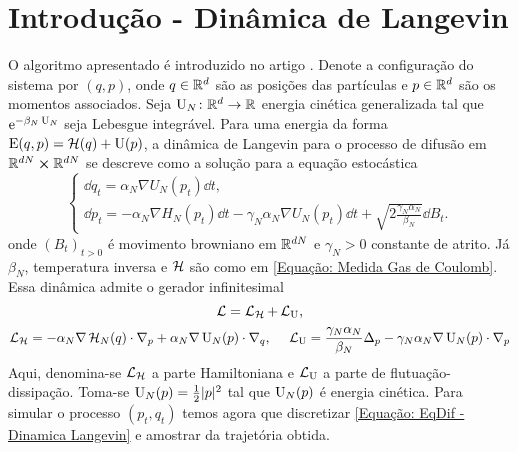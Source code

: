 \section{Introdução - Dinâmica de Langevin}

O algoritmo apresentado é introduzido no artigo \cite{Chafa2018}. Denote a configuração do sistema por $(q, p)$, onde $q \in \mathbb{R}^d$ são as posições das partículas e $p \in \mathbb{R}^d$ são os momentos associados. Seja $\operatorname{U}_N \colon \mathbb{R}^d \rightarrow \mathbb{R}$ energia cinética generalizada tal que $\operatorname{\textrm e}^{-\beta_N \operatorname{U}_N}$ seja Lebesgue integrável. Para uma energia da forma $\operatorname{E}(q,p) = \operatorname{\mathcal{H}}(q) + \operatorname{U}(p)$, a dinâmica de Langevin para o processo de difusão em $\mathbb{R}^{dN} \cross \mathbb{R}^{dN}$ se descreve como a solução para a equação estocástica \cite{Stoltz2018} 
\begin{equation}
\begin{cases}
	\dd q_t = \alpha_N \nabla U_N (p_t) \dd t, \\
	\dd p_t = -\alpha_N \nabla H_N(p_t) \dd t - \gamma_N \alpha_N \nabla U_N(p_t) \dd t + \sqrt{2\frac{\gamma_N \alpha_N}{\beta_N}} \dd B_t.
\end{cases}
\label{Equação: EqDif - Dinamica Langevin}
\end{equation}
onde $(B_t)_{t>0}$ é movimento browniano em $\mathbb{R}^{dN}$ e $\gamma_N > 0$ constante de atrito. Já $\beta_N$, temperatura inversa e $\operatorname{\mathcal{H}}$ são como em \ref{Equação: Medida Gas de Coulomb}. Essa dinâmica admite o gerador infinitesimal 
\[
	\operatorname{\mathcal{L}} = \operatorname{\mathcal{L}}_{\operatorname{\mathcal{H}}} + \operatorname{\mathcal{L}}_{\operatorname{U}},
\]
\[
 \operatorname{\mathcal{L}}_{\operatorname{\mathcal{H}}} = -\alpha_N \nabla\operatorname{\mathcal{H}}_N(q) \cdot \nabla_p + \alpha_N \nabla \operatorname{U}_N(p) \cdot \nabla_q, \ \ \ \ \operatorname{\mathcal{L}}_{\operatorname{U}} = \frac{\gamma_N\alpha_N}{\beta_N} \Delta_p - \gamma_N \alpha_N \nabla \operatorname{U}_N(p) \cdot \nabla_p 
\]
Aqui, denomina-se $\operatorname{\mathcal{L}}_{\operatorname{\mathcal{H}}}$ a parte Hamiltoniana e $\operatorname{\mathcal{L}}_{\operatorname{U}}$ a parte de flutuação-dissipação. Toma-se $\operatorname{U}_N(p) = \frac{1}{2} |p|^2$ tal que $\operatorname{U}_N(p)$ é energia cinética. Para simular o processo $(p_t,q_t)$ temos agora que discretizar \ref{Equação: EqDif - Dinamica Langevin} e amostrar da trajetória obtida.